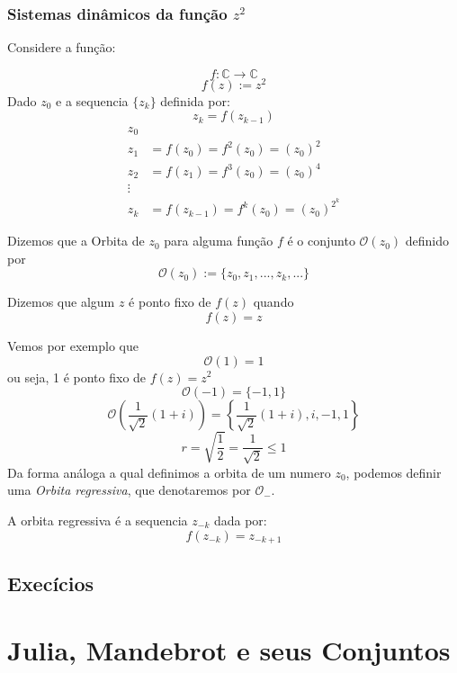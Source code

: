 \subsection{Sistemas dinâmicos da função \(z^2\)}

Considere a função:

\[ 
    f: \mathbb{C} \longrightarrow \mathbb{C} 
\]
\[ 
    f(z) := z^2
\]
Dado \(z_ 0\) e a sequencia \(\{z_k\}\) definida por:
\[
    z_k = f(z_{k-1})
\]
\begin{align*}
    z_0 &\\
    z_1 &= f(z_0) = f^2(z_0) = (z_0)^2 \\
    z_2 &= f(z_1) = f^3(z_0) = (z_0)^4 \\
    \vdots \\
    z_k &= f(z_{k-1}) = f^k(z_0) = (z_0)^{2^k} 
\end{align*}

\begin{definition}[Orbita de \(z_0\)]
    Dizemos que a Orbita de \(z_0\) para alguma função \(f\) é o conjunto \(\mathcal{O}(z_0)\) definido por
    \[
        \mathcal{O}(z_0) := \{z_0, z_1, ..., z_k, ...\}
    \]
\end{definition}
\begin{definition}
    Dizemos que algum \( z \) é ponto fixo de \(f(z)\) quando
    \[ 
        f(z) = z 
    \]
\end{definition}
Vemos por exemplo que
\[
    \mathcal{O}(1) = {1}
\]
ou seja, 1 é ponto fixo de \( f(z) = z^2 \)
\[
    \mathcal{O}(-1) = \{-1, 1\}
\]
\[
    \mathcal{O}\left(\frac{1}{\sqrt{2}} (1 + i)\right) = \left\{ \frac{1}{\sqrt{2}} (1 + i), i , -1 , 1 \right\}
\]
\[
    r = \sqrt{\frac{1}{2}} = \frac{1}{\sqrt{2}} \leq 1
\]
Da forma análoga a qual definimos a orbita de um numero \(z_0\), podemos definir uma \textit{Orbita regressiva}, que denotaremos por \(\mathcal{O}_{-}\).
\begin{definition}
    A orbita regressiva é a sequencia {\(z_{-k}\)} dada por:
    \[
        f(z_{-k}) = z_{-k + 1}
    \]
\end{definition}

\section{Execícios}

\chapter{Julia, Mandebrot e seus Conjuntos}

